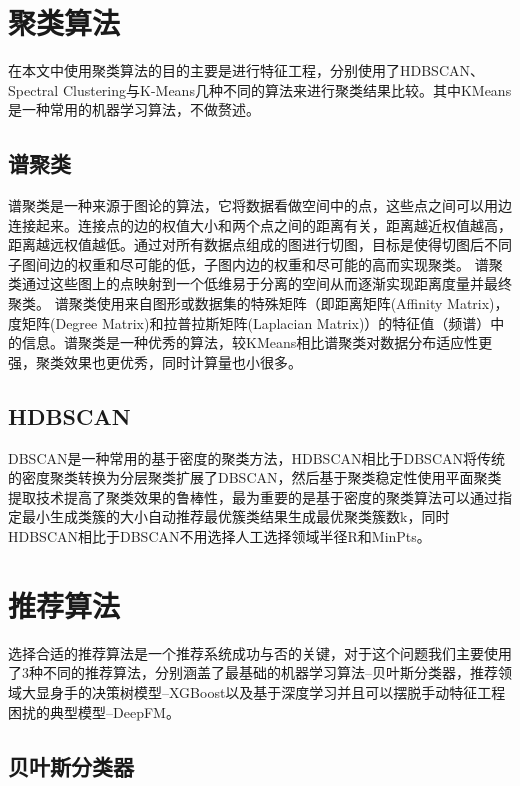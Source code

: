 \section{聚类算法}

在本文中使用聚类算法的目的主要是进行特征工程，分别使用了HDBSCAN、Spectral Clustering与K-Means几种不同的算法来进行聚类结果比较。其中KMeans是一种常用的机器学习算法，不做赘述。

\subsection{谱聚类}

谱聚类\cite{von2007tutorial}是一种来源于图论的算法，它将数据看做空间中的点，这些点之间可以用边连接起来。连接点的边的权值大小和两个点之间的距离有关，距离越近权值越高，距离越远权值越低。通过对所有数据点组成的图进行切图，目标是使得切图后不同子图间边的权重和尽可能的低，子图内边的权重和尽可能的高而实现聚类。
谱聚类通过这些图上的点映射到一个低维易于分离的空间从而逐渐实现距离度量并最终聚类。 谱聚类使用来自图形或数据集的特殊矩阵（即距离矩阵(Affinity Matrix)，度矩阵(Degree Matrix)和拉普拉斯矩阵(Laplacian Matrix)）的特征值（频谱）中的信息。谱聚类是一种优秀的算法，较KMeans相比谱聚类对数据分布适应性更强，聚类效果也更优秀，同时计算量也小很多。

\subsection{HDBSCAN}

DBSCAN是一种常用的基于密度的聚类方法，HDBSCAN\cite{mcinnes2017hdbscan}相比于DBSCAN将传统的密度聚类转换为分层聚类扩展了DBSCAN，然后基于聚类稳定性使用平面聚类提取技术提高了聚类效果的鲁棒性，最为重要的是基于密度的聚类算法可以通过指定最小生成类簇的大小自动推荐最优簇类结果生成最优聚类簇数k，同时HDBSCAN相比于DBSCAN不用选择人工选择领域半径R和MinPts。

\section{推荐算法}

选择合适的推荐算法是一个推荐系统成功与否的关键，对于这个问题我们主要使用了3种不同的推荐算法，分别涵盖了最基础的机器学习算法--贝叶斯分类器，推荐领域大显身手的决策树模型--XGBoost以及基于深度学习并且可以摆脱手动特征工程困扰的典型模型--DeepFM。

\subsection{贝叶斯分类器}

